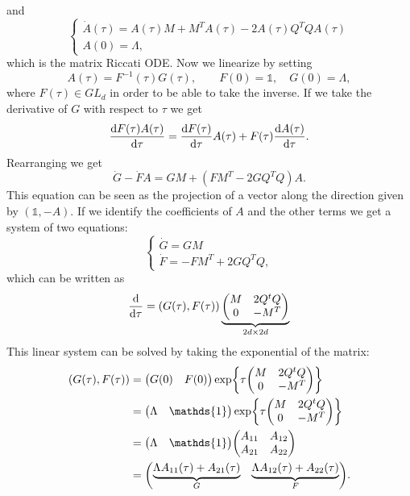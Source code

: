 and
\begin{equation*}
    \begin{cases}
        \dot{A}(\tau) = A(\tau)M + M^TA(\tau) - 2A(\tau)Q^TQA(\tau) \\
        A(0) = \Lambda,
    \end{cases}
\end{equation*}
which is the matrix Riccati ODE. Now we linearize by setting
\begin{equation*}
    A(\tau) = F^{-1}(\tau)G(\tau), \qquad F(0) = \mathds{1}, \quad G(0) = \Lambda,
\end{equation*}
where $F(\tau)\in GL_d$ in order to be able to take the inverse. If we take the derivative of $G$ with respect to $\tau$ we get
\begin{equation*}
    \dv{F(\tau)A(\tau)}{\tau} = \dv{F(\tau)}{\tau} A(\tau) + F(\tau)\dv{A(\tau)}{\tau}.
\end{equation*}
Rearranging we get
\begin{equation}
    \dot{G} - \dot{F}A = GM + (FM^T - 2GQ^TQ)A.
\end{equation}
This equation can be seen as the projection of a vector along the direction given by $(\mathds{1}, -A)$. If we identify the coefficients of $A$ and the other terms we get a system of two equations:
\begin{equation}
    \begin{cases}
        \dot{G} = GM \\
        \dot{F} = -FM^T + 2GQ^TQ,
    \end{cases}
\end{equation}
which can be written as
\begin{equation}
    \dv{}{\tau} (G(\tau), F(\tau)) = (G(\tau), F(\tau))\underbrace{\mqty(M & 2Q^tQ \\ 0 & -M^T)}_{2d\times 2d}
\end{equation}
This linear system can be solved by taking the exponential of the matrix:
\begin{align}%
    \notag(G(\tau), F(\tau)) &= \mqty(G(0) & F(0))\exp{\tau\mqty(M & 2Q^tQ \\ 0 & -M^T)} \\
    &=
    \notag\mqty(\Lambda & \mathds{1})\exp{\tau\mqty(M & 2Q^tQ \\ 0 & -M^T)} \\
    &=
    \notag\mqty(\Lambda & \mathds{1})\mqty(A_{11} & A_{12} \\ A_{21} & A_{22}) \\
    &=
    \mqty(\underbrace{\Lambda A_{11}(\tau) + A_{21}(\tau)}_{G} & \underbrace{\Lambda A_{12}(\tau) + A_{22}(\tau)}_{F}).
\end{align}
